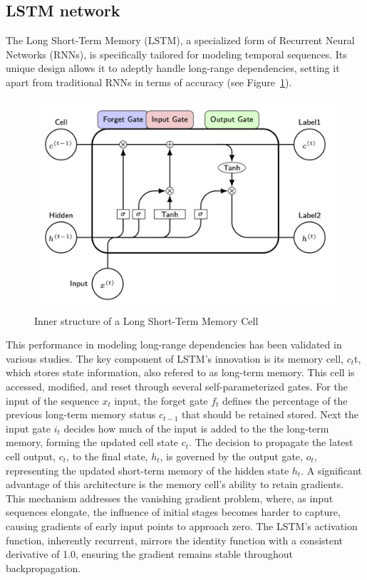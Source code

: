 \documentclass[
]{agujournal2019}
\begin{document}
\hypertarget{lstm-network}{%
\subsection{LSTM network}\label{lstm-network}}

The Long Short-Term Memory (LSTM), a specialized form of Recurrent
Neural Networks (RNNs), is specifically tailored for modeling temporal
sequences. Its unique design allows it to adeptly handle long-range
dependencies, setting it apart from traditional RNNs in terms of
accuracy (see Figure~\ref{fig-lstm}).

\begin{figure}

{\centering \includegraphics{draw_lstm.png}

}

\caption{\label{fig-lstm}Inner structure of a Long Short-Term Memory
Cell}

\end{figure}

This performance in modeling long-range dependencies has been validated
in various studies. The key component of LSTM's innovation is its memory
cell, \(c_t\)t, which stores state information, also refered to as
long-term memory. This cell is accessed, modified, and reset through
several self-parameterized gates. For the input of the sequence \(x_t\)
input, the forget gate \(f_t\) defines the percentage of the previous
long-term memory status \(c_{t-1}\) that should be retained
stored\hspace{0pt}. Next the input gate \(i_t\) decides how much of the
input is added to the the long-term memory, forming the updated cell
state \(c_{t}\). The decision to propagate the latest cell output,
\(c_t\), to the final state, \(h_t\), is governed by the output gate,
\(o_t\), representing the updated short-term memory of the hidden state
\(h_t\). A significant advantage of this architecture is the memory
cell's ability to retain gradients. This mechanism addresses the
vanishing gradient problem, where, as input sequences elongate, the
influence of initial stages becomes harder to capture, causing gradients
of early input points to approach zero. The LSTM's activation function,
inherently recurrent, mirrors the identity function with a consistent
derivative of 1.0, ensuring the gradient remains stable throughout
backpropagation.
\end{document}
